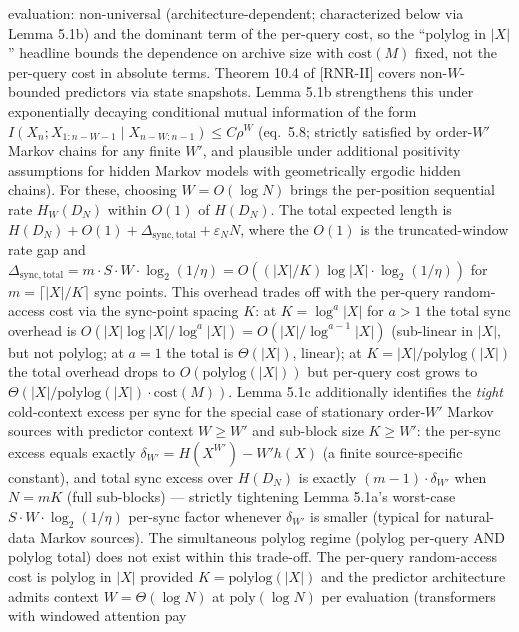 \documentclass[
]{article}
\begin{document}
\begin{itemize}
  evaluation: non-universal (architecture-dependent; characterized below
  via Lemma 5.1b) and the dominant term of the per-query cost, so the
  ``polylog in $|X|$'' headline bounds the dependence on archive size
  with $\mathrm{cost}(M)$ fixed, not the per-query cost in absolute terms.
  Theorem 10.4 of [RNR-II] covers non-$W$-bounded predictors via state snapshots.
  Lemma 5.1b strengthens this under exponentially decaying
  conditional mutual information of the form
  $I(X_n; X_{1:n-W-1} \mid X_{n-W:n-1}) \leq C \rho^W$ (eq.\ 5.8;
  strictly satisfied by order-$W'$ Markov chains for any finite
  $W'$, and plausible under additional positivity assumptions for
  hidden Markov models with geometrically ergodic hidden chains).
  For these, choosing $W = O(\log N)$ brings the per-position
  sequential rate $H_W(D_N)$ within $O(1)$ of $H(D_N)$. The total
  expected length is $H(D_N) + O(1) + \Delta_{\mathrm{sync,total}} +
  \varepsilon_N N$, where the $O(1)$ is the truncated-window rate
  gap and $\Delta_{\mathrm{sync,total}} = m \cdot S \cdot W \cdot
  \log_2(1/\eta) = O((|X|/K) \log |X| \cdot \log_2(1/\eta))$ for
  $m = \lceil |X|/K \rceil$ sync points. This overhead trades off
  with the per-query random-access cost via the sync-point spacing
  $K$: at $K = \log^a |X|$ for $a > 1$ the total sync overhead is
  $O(|X| \log |X|/\log^a |X|) = O(|X|/\log^{a-1} |X|)$ (sub-linear
  in $|X|$, but not polylog; at $a = 1$ the total is $\Theta(|X|)$,
  linear); at $K = |X|/\mathrm{polylog}(|X|)$ the total overhead
  drops to $O(\mathrm{polylog}(|X|))$ but per-query cost grows to
  $\Theta(|X|/\mathrm{polylog}(|X|) \cdot \mathrm{cost}(M))$.
  Lemma 5.1c additionally identifies the \emph{tight} cold-context
  excess per sync for the special case of stationary order-$W'$ Markov
  sources with predictor context $W \geq W'$ and sub-block size
  $K \geq W'$: the per-sync excess equals exactly
  $\delta_{W'} = H(X^{W'}) - W' h(X)$ (a finite source-specific
  constant), and total sync excess over $H(D_N)$ is exactly
  $(m-1) \cdot \delta_{W'}$ when $N = m K$ (full sub-blocks) —
  strictly tightening Lemma 5.1a's worst-case
  $S \cdot W \cdot \log_2(1/\eta)$ per-sync factor whenever
  $\delta_{W'}$ is smaller (typical for natural-data Markov sources).
  The simultaneous polylog regime (polylog per-query AND polylog
  total) does not exist within this trade-off. The per-query random-access cost
  is polylog in $|X|$ provided $K = \mathrm{polylog}(|X|)$ and the
  predictor architecture admits context $W = \Theta(\log N)$ at
  $\mathrm{poly}(\log N)$ per evaluation (transformers with windowed attention pay

\end{itemize}
\end{document}
